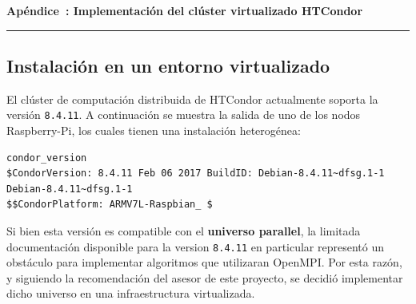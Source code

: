 
{}


\vspace{40pt}

{\centering \normalfont\huge\bfseries Apéndice~\thechapter: Implementación del clúster virtualizado HTCondor~\par}

\vspace{10pt}

{\centering \rule{\textwidth}{0.4pt} \par}

\vspace{40pt}



\FloatBarrier\subsection{Instalación en un entorno virtualizado}

El clúster de computación distribuida de HTCondor actualmente soporta la versión \texttt{8.4.11}. A continuación se muestra la salida de uno de los nodos Raspberry-Pi, los cuales tienen una instalación heterogénea:

\begin{verbatim}
condor_version
$CondorVersion: 8.4.11 Feb 06 2017 BuildID: Debian-8.4.11~dfsg.1-1 Debian-8.4.11~dfsg.1-1
$$CondorPlatform: ARMV7L-Raspbian_ $
\end{verbatim}


Si bien esta versión es compatible con el \textbf{universo parallel}, la limitada documentación disponible para la version \texttt{8.4.11} en particular representó un obstáculo para implementar algoritmos que utilizaran OpenMPI. Por esta razón, y siguiendo la recomendación del asesor de este proyecto, se decidió implementar dicho universo en una infraestructura virtualizada.

